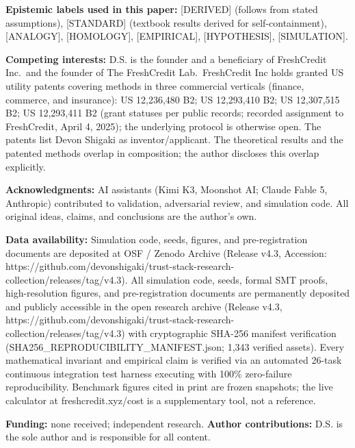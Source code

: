 \documentclass[
]{article}
\newcounter{none} %
\begin{document}
\textbf{Epistemic labels used in this paper:} {[}DERIVED{]} (follows
from stated assumptions), {[}STANDARD{]} (textbook results derived for
self-containment), {[}ANALOGY{]}, {[}HOMOLOGY{]}, {[}EMPIRICAL{]},
{[}HYPOTHESIS{]}, {[}SIMULATION{]}.

\textbf{Competing interests:} D.S. is the founder and a beneficiary of
FreshCredit Inc.~and the founder of The FreshCredit Lab.~FreshCredit Inc
holds granted US utility patents covering methods in three commercial
verticals (finance, commerce, and insurance): US 12,236,480 B2; US
12,293,410 B2; US 12,307,515 B2; US 12,293,411 B2 (grant statuses per
public records; recorded assignment to FreshCredit, April 4, 2025); the
underlying protocol is otherwise open. The patents list Devon Shigaki as
inventor/applicant. The theoretical results and the patented methods
overlap in composition; the author discloses this overlap explicitly.

\textbf{Acknowledgments:} AI assistants (Kimi K3, Moonshot AI; Claude
Fable 5, Anthropic) contributed to validation, adversarial review, and
simulation code. All original ideas, claims, and conclusions are the
author's own.

\textbf{Data availability:} Simulation code, seeds, figures, and
pre-registration documents are deposited at OSF / Zenodo Archive
(Release v4.3, Accession:
https://github.com/devonshigaki/trust-stack-research-collection/releases/tag/v4.3).
All simulation code, seeds, formal SMT proofs, high-resolution figures,
and pre-registration documents are permanently deposited and publicly
accessible in the open research archive (Release v4.3,
https://github.com/devonshigaki/trust-stack-research-collection/releases/tag/v4.3)
with cryptographic SHA-256 manifest verification
(SHA256\_REPRODUCIBILITY\_MANIFEST.json; 1,343 verified assets). Every
mathematical invariant and empirical claim is verified via an automated
26-task continuous integration test harness executing with 100\%
zero-failure reproducibility. Benchmark figures cited in print are
frozen snapshots; the live calculator at freshcredit.xyz/cost is a
supplementary tool, not a reference.

\textbf{Funding:} none received; independent research. \textbf{Author
contributions:} D.S. is the sole author and is responsible for all
content.
\end{document}
